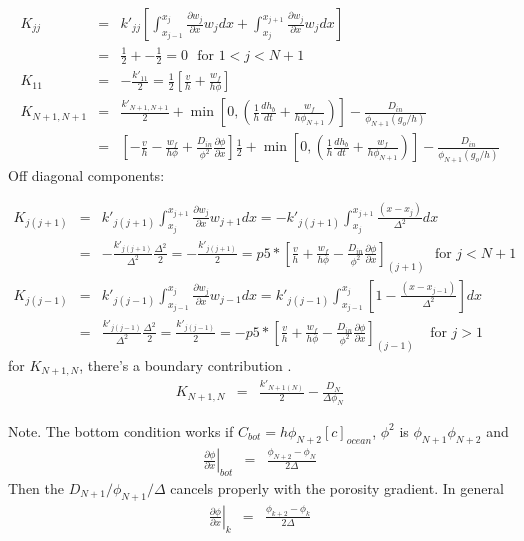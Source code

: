 \begin{eqnarray}
K_{jj} &=& k'_{jj}\left[ \int_{x_{j-1}}^{x_j} \frac{\partial w_j}{\partial x}
w_j dx + \int_{x_{j}}^{x_{j+1}} \frac{\partial w_j}{\partial x}
w_j dx \right] \nonumber \\
&  = &  \frac{1}{2} + -\frac{1}{2} = 0  \ \ \ \mbox{for } 1 < j < N+1 \nonumber \\ 
K_{11} & = &  -\frac{k'_{11}}{2} = \frac{1}{2}\left[\frac{v}{h} +
  \frac{w_f}{h\phi}\right] \nonumber \\
K_{N+1,N+1}  & = & \frac{k'_{N+1,N+1}}{2} +\min\left[0, \left(\frac{1}{h}\frac{dh_b}{dt} +
\frac{w_f}{h \phi_{N+1}}\right)\right] -
\frac{D_{in}}{\phi_{N+1}(g_o/h)} \nonumber \\
& = & \left[-\frac{v}{h} - \frac{w_f}{h\phi}+ \frac{D_{in}}{\phi^2}\frac{\partial
      \phi}{\partial x}\right]\frac{1}{2} +\min\left[0, \left(\frac{1}{h}\frac{dh_b}{dt} +
\frac{w_f}{h \phi_{N+1}}\right)\right] -
\frac{D_{in}}{\phi_{N+1}(g_o/h)} \nonumber
\end{eqnarray}
Off diagonal components:

\begin{eqnarray}
K_{j(j+1)} &=& k'_{j(j+1)}\int_{x_{j}}^{x_{j+1}} \frac{\partial w_j}{\partial x}
w_{j+1} dx  =
-k'_{j(j+1)}\int_{x_{j}}^{x_{j+1}}\frac{(x-x_j)}{\Delta^2}dx \nonumber
\\
& = & -\frac{k'_{j(j+1)}}{\Delta^2}\frac{\Delta^2}{2} =
-\frac{k'_{j(j+1)}}{2}  = p5*\left[\frac{v}{h} + \frac{w_f}{h\phi}- \frac{D_{in}}{\phi^2}\frac{\partial
      \phi}{\partial x}\right]_{(j+1)} \ \ \ \mbox{for }  j < N+1 \nonumber \\
K_{j(j-1)} &=& k'_{j(j-1)}\int_{x_{j-1}}^{x_{j}} \frac{\partial w_j}{\partial x}
w_{j-1} dx  =
k'_{j(j-1)}\int_{x_{j-1}}^{x_{j}}\left[1 -
  \frac{(x-x_{j-1})}{\Delta^2}\right] dx \nonumber
\\
& = & \frac{k'_{j(j-1)}}{\Delta^2}\frac{\Delta^2}{2} =
\frac{k'_{j(j-1)}}{2}  = -p5*\left[\frac{v}{h} + \frac{w_f}{h\phi}- \frac{D_{in}}{\phi^2}\frac{\partial
      \phi}{\partial x}\right]_{(j-1)} \ \ \ \ \ \mbox{for }  j > 1 
\end{eqnarray}
for $K_{N+1,N}$, there's a boundary contribution .
\begin{eqnarray}
K_{N+1,N} & = & \frac{k'_{N+1(N)}}{2} - \frac{D_N}{\Delta \phi_{N}} 
\end{eqnarray}

Note.  The bottom condition works if $C_{bot} = h
\phi_{N+2}[c]_{ocean}$, $\phi^2$ is $\phi_{N+1}\phi_{N+2}$ and
\begin{eqnarray}
\left. \frac{\partial \phi}{\partial x}\right|_{bot} & = &
\frac{\phi_{N+2} - \phi_{N}}{2\Delta}
\end{eqnarray}
Then the $D_{N+1}/\phi_{N+1}/\Delta$ cancels properly with the
porosity gradient.    In general
\begin{eqnarray}
\left. \frac{\partial \phi}{\partial x}\right|_{k} & = &
\frac{\phi_{k+2} - \phi_{k}}{2\Delta}
\end{eqnarray}

